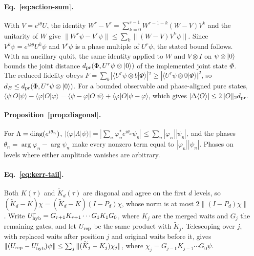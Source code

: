 \documentclass[pra,twocolumn,superscriptaddress,nofootinbib,floatfix]{revtex4-2}
\theoremstyle{remark}
\newcommand{\dpr}{d_{\rm pr}}
\newcommand{\revcolor}{\color{blue}}
\DeclareRobustCommand{\rev}[1]{{\revcolor #1}}
\begin{document}
\paragraph{\rev{Eq.~\eqref{eq:action-sum}.}}
\rev{With \(V=e^{i\theta}U\), the identity \(W^r-V^r=\sum_{k=0}^{r-1}W^{r-1-k}(W-V)V^k\) and the unitarity of \(W\) give \(\|W^r\psi-V^r\psi\|\le\sum_k\|(W-V)V^k\psi\|\).} \rev{Since \(V^k\psi=e^{ik\theta}U^k\psi\) and \(V^r\psi\) is a phase multiple of \(U^r\psi\), the stated bound follows.} \rev{With an ancillary qubit, the same identity applied to \(W\) and \(V\otimes I\) on \(\psi\otimes\ket0\) bounds the joint distance \(\dpr(\Phi,U^r\psi\otimes\ket0)\) of the implemented joint state \(\Phi\).} \rev{The reduced fidelity obeys \(F=\sum_b|\langle U^r\psi\otimes b|\Phi\rangle|^2\ge|\langle U^r\psi\otimes0|\Phi\rangle|^2\), so \(d_B\le\dpr(\Phi,U^r\psi\otimes\ket0)\).} \rev{For a bounded observable and phase-aligned pure states, \(\langle\psi|O|\psi\rangle-\langle\varphi|O|\varphi\rangle=\langle\psi-\varphi|O|\psi\rangle+\langle\varphi|O|\psi-\varphi\rangle\), which gives \(|\Delta\langle O\rangle|\le2\|O\|_2\dpr\).}

\paragraph{\rev{Proposition~\ref{prop:diagonal}.}}
\rev{For \(\Lambda={\rm diag}(e^{i\theta_n})\), \(|\langle\varphi|\Lambda|\psi\rangle|=|\sum_n\varphi_n^*e^{i\theta_n}\psi_n|\le\sum_n|\varphi_n||\psi_n|\), and the phases \(\theta_n=\arg\varphi_n-\arg\psi_n\) make every nonzero term equal to \(|\varphi_n||\psi_n|\).} \rev{Phases on levels where either amplitude vanishes are arbitrary.}

\paragraph{\rev{Eq.~\eqref{eq:kerr-tail}.}}
\rev{Both \(K(\tau)\) and \(\widetilde K_d(\tau)\) are diagonal and agree on the first \(d\) levels, so \((\widetilde K_d-K)\chi=(\widetilde K_d-K)(I-P_d)\chi\), whose norm is at most \(2\|(I-P_d)\chi\|\).} \rev{Write \(U_{\rm hyb}^r=G_{r+1}K_{r+1}\cdots G_1K_1G_0\), where \(K_j\) are the merged waits and \(G_j\) the remaining gates, and let \(U_{\rm rep}\) be the same product with \(\widetilde K_j\).} \rev{Telescoping over \(j\), with replaced waits after position \(j\) and original waits before it, gives \(\|(U_{\rm rep}-U_{\rm hyb}^r)\psi\|\le\sum_j\|(\widetilde K_j-K_j)\chi_j\|\), where \(\chi_j=G_{j-1}K_{j-1}\cdots G_0\psi\).}
\end{document}
